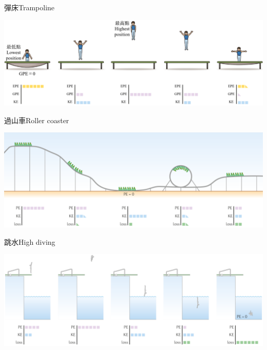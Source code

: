 \documentclass[beamer=true]{standalone}
\begin{document}
\begin{frame}{彈床Trampoline}
    \par
    {\par\centering
        \includegraphics[width=\textwidth]{assets/eaf85404.png}
        \par}
\end{frame}

\begin{frame}{過山車Roller coaster}
    \par
    {\par\centering
        \includegraphics[width=\textwidth]{assets/d6c1ec53.png}
        \par}
\end{frame}

\begin{frame}{跳水High diving}
    \par
    {\par\centering
        \includegraphics[width=\textwidth]{assets/b76432a0.png}
        \par}
\end{frame}
\end{document}
